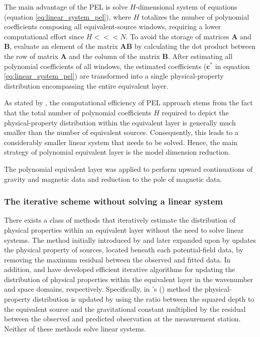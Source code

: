 The main advantage of the PEL is solve $H$-dimensional system of equations 
(equation \ref{eq:linear_system_pel}), where $H$ totalizes the number of polynomial coefficients
composing all equivalent-source windows,  requiring a lower computational effort since $H <<< N$.
To avoid the storage of matrices $\mathbf{A}$ and $\mathbf{B}$,  \cite{oliveirajr-etal2013}
evaluate an element of the matrix $\mathbf{A} \mathbf{B} $ by calculating the 
dot product between the row of matrix $\mathbf{A}$ and the column of the matrix $\mathbf{B}$. 
After estimating all polynomial coefficients of all windows, the estimated coefficients 
($\mathbf{c}^{\ast}$ in equation \ref{eq:linear_system_pel})
are transformed into a single physical-property distribution encompassing the entire equivalent layer. 

As stated by \cite{oliveirajr-etal2013}, the computational efficiency of PEL approach
stems from the fact that the total number of polynomial coefficients $H$ required to depict the 
physical-property distribution within the equivalent layer is generally much smaller than the number of equivalent sources. 
Consequently, this leads to a considerably smaller linear system that needs to be solved.
Hence, the main strategy of polynomial equivalent layer  is the model dimension reduction.

The polynomial equivalent layer was applied to perform upward continuations of gravity and magnetic data 
and reduction to the pole of magnetic data.


\subsubsection{The iterative scheme without solving a linear system}

There exists a class of methods that iteratively estimate the distribution of physical properties 
within an equivalent layer without the need to solve linear systems. 
The method initially introduced by \cite{cordell1992} and later expanded upon by \cite{guspi-novara2009} updates the physical property of sources, located beneath each potential-field data, by removing the maximum residual between the observed and fitted data. 
In addition, \cite{xia-sprowl1991} and \cite{xia-etal1993} have developed efficient iterative algorithms 
for updating the distribution of physical properties within the equivalent layer in the wavenumber and space domains, respectively.
Specifically, in \citeauthor{xia-sprowl1991}'s (\citeyear{xia-sprowl1991}) method the physical-property distribution is updated by using the ratio between the squared depth to the equivalent source and the gravitational constant multiplied by the residual between the observed and predicted observation at the measurement station. 
Neither of these methods solve linear systems.

